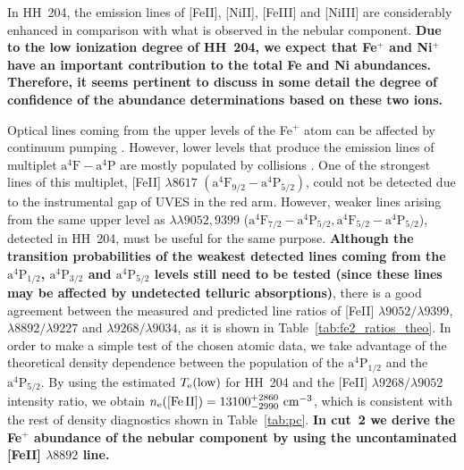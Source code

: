 \documentclass[twocolumn,linenumbers]{aastex63}
\begin{document}
In HH~204, the emission lines of [Fe\thinspace II], [Ni\thinspace II], [Fe\thinspace III] and [Ni\thinspace III] are considerably enhanced in comparison with what is observed in the nebular component. {\bf Due to the low ionization degree of HH~204, we expect that Fe$^{+}$ and Ni$^{+}$ have an important contribution to the total Fe and Ni abundances. Therefore, it seems pertinent to discuss in some detail the degree of confidence of the abundance determinations based on these two ions. }

Optical lines coming from the upper levels of the Fe$^{+}$ atom can be affected by continuum pumping \citep[][]{Lucy95,rodriguez99, verner00}. However, lower levels that produce the emission lines of multiplet $\text{a}^{4}\text{F}-\text{a}^{4}\text{P}$ are mostly populated by collisions \citep[][]{Baldwin96}. One of the strongest lines of this multiplet, [Fe\thinspace II] $\lambda 8617$ $(\text{a}^{4}\text{F}_{9/2}-\text{a}^{4}\text{P}_{5/2})$, could not be detected due to the instrumental gap of UVES in the red arm. However, weaker lines arising from the same upper level as $\lambda\lambda 9052, 9399$ ($\text{a}^{4}\text{F}_{7/2}-\text{a}^{4}\text{P}_{5/2}, \text{a}^{4}\text{F}_{5/2}-\text{a}^{4}\text{P}_{5/2} $), detected in HH~204, must be useful for the same purpose. {\bf Although the transition probabilities of the weakest detected lines coming from the $\text{a}^{4}\text{P}_{1/2}$, $\text{a}^{4}\text{P}_{3/2}$ and  $\text{a}^{4}\text{P}_{5/2}$ levels still need to be tested (since these lines may be affected by undetected telluric absorptions)}, there is a good agreement between the measured and predicted line ratios of [Fe\thinspace II] $\lambda9052/\lambda9399$, $\lambda8892/\lambda9227$ and $\lambda9268/\lambda9034$, as it is shown in Table~\ref{tab:fe2_ratios_theo}. In order to make a simple test of the chosen atomic data, we take advantage of the theoretical density dependence between the population of the $\text{a}^{4}\text{P}_{1/2}$ and the $\text{a}^{4}\text{P}_{5/2}$. By using the estimated $T_{\rm e}(\text{low})$ for HH~204 and the [Fe\thinspace II] $\lambda9268/\lambda9052$ intensity ratio, we obtain $n_{\rm e}(\text{[Fe\thinspace II]})=13100 ^{+2860} _{-2990} \text{ cm}^{-3}$, which is consistent with the rest of density diagnostics shown in Table~\ref{tab:pc}. {\bf In cut~2 we derive the Fe$^{+}$ abundance of the nebular component by using the uncontaminated [Fe\thinspace II] $\lambda 8892$ line.} %
\end{document}
